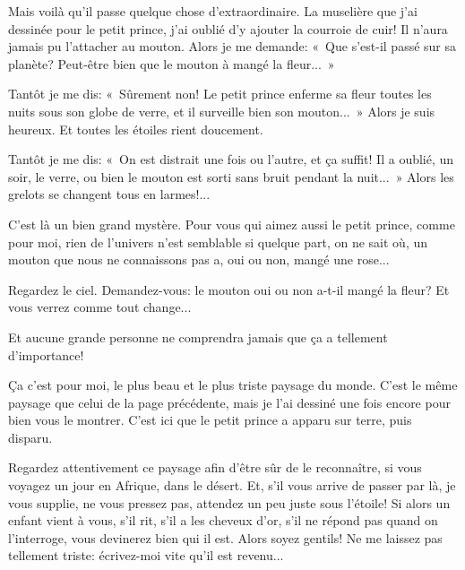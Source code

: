 \documentclass[a4paper]{report}
\begin{document}
Mais voilà qu'il passe quelque chose d'extraordinaire. La muselière que j'ai dessinée pour le petit prince, j'ai oublié d'y ajouter la courroie de cuir! Il n'aura jamais pu l'attacher au mouton. Alors je me demande: «~Que s'est-il passé sur sa planète? Peut-être bien que le mouton à mangé la fleur...~»

Tantôt je me dis: «~Sûrement non! Le petit prince enferme sa fleur toutes les nuits sous son globe de verre, et il surveille bien son mouton...~» Alors je suis heureux. Et toutes les étoiles rient doucement.

Tantôt je me dis: «~On est distrait une fois ou l'autre, et ça suffit! Il a oublié, un soir, le verre, ou bien le mouton est sorti sans bruit pendant la nuit...~» Alors les grelots se changent tous en larmes!...

C'est là un bien grand mystère. Pour vous qui aimez aussi le petit prince, comme pour moi, rien de l'univers n'est semblable si quelque part, on ne sait où, un mouton que nous ne connaissons pas a, oui ou non, mangé une rose...

Regardez le ciel. Demandez-vous: le mouton oui ou non a-t-il mangé la fleur? Et vous verrez comme tout change...

Et aucune grande personne ne comprendra jamais que ça a tellement d'importance!


Ça c'est pour moi, le plus beau et le plus triste paysage du monde. C'est le même paysage que celui de la page précédente, mais je l'ai dessiné une fois encore pour bien vous le montrer. C'est ici que le petit prince a apparu sur terre, puis disparu.

Regardez attentivement ce paysage afin d'être sûr de le reconnaître, si vous voyagez un jour en Afrique, dans le désert. Et, s'il vous arrive de passer par là, je vous supplie, ne vous pressez pas, attendez un peu juste sous l'étoile! Si alors un enfant vient à vous, s'il rit, s'il a les cheveux d'or, s'il ne répond pas quand on l'interroge, vous devinerez bien qui il est. Alors soyez gentils! Ne me laissez pas tellement triste: écrivez-moi vite qu'il est revenu...
\end{document}
